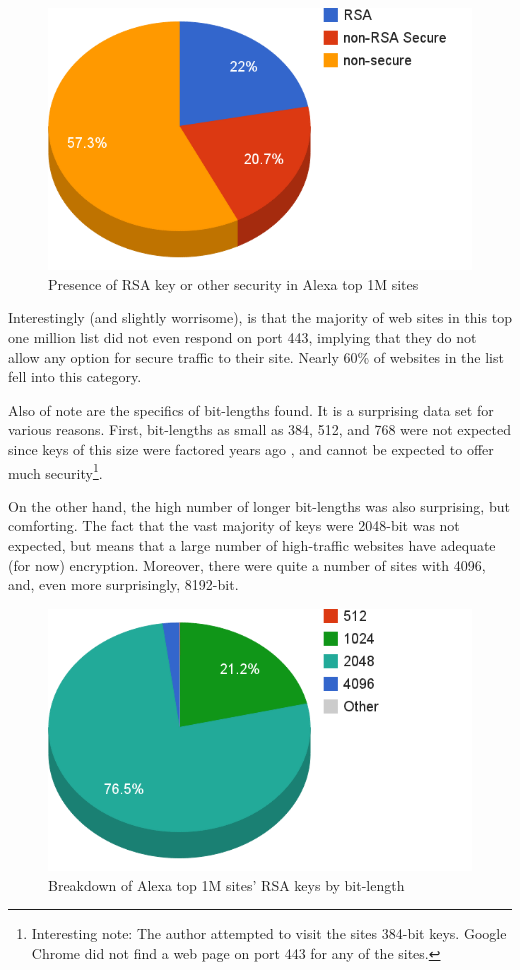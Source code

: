 \documentclass[smallextended]{svjour3}       %
\begin{document}
\begin{figure}
   \centering
   \includegraphics[width=0.75\linewidth]{cert_security}
   \caption{Presence of RSA key or other security in Alexa top 1M sites}
   \label{fig:certs}
\end{figure}

Interestingly (and slightly worrisome), is that the majority of web sites in
this top one million list did not even respond on port 443, implying that
they do not allow any option for secure traffic to their site. Nearly 60\% of
websites in the list fell into this category.

Also of note are the specifics of bit-lengths found. It is a surprising data
set for various reasons. First, bit-lengths as small as 384, 512, and 768 were
not expected since keys of this size were factored years ago
\citep{rsa2007challenge}, and cannot be expected to offer much
security\footnote{Interesting note: The author attempted to visit the sites
384-bit keys. Google Chrome did not find a web page on port 443 for any of
the sites.}.

On the other hand, the high number of longer bit-lengths was also surprising,
but comforting. The fact that the vast majority of keys were 2048-bit was not
expected, but means that a large number of high-traffic websites have adequate
(for now) encryption. Moreover, there were quite a number of sites with 4096,
and, even more surprisingly, 8192-bit.

\begin{figure}
   \centering
   \includegraphics[width=0.75\linewidth]{bit_length}
   \caption{Breakdown of Alexa top 1M sites' RSA keys by bit-length}
   \label{fig:bits}
\end{figure}
\end{document}

